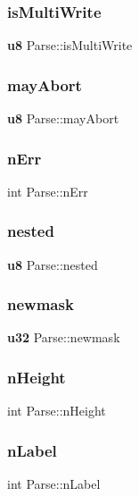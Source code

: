 \subsubsection{isMultiWrite}
{\footnotesize\ttfamily \textbf{ u8} Parse\+::is\+Multi\+Write}

\mbox{\label{struct_parse_a1813c80797fcdba29e95813284619e57}} 
\subsubsection{mayAbort}
{\footnotesize\ttfamily \textbf{ u8} Parse\+::may\+Abort}

\mbox{\label{struct_parse_ac7206f0c7e580ab32b7dfb20950bb1c9}} 
\subsubsection{nErr}
{\footnotesize\ttfamily int Parse\+::n\+Err}

\mbox{\label{struct_parse_a33d62687b6d368acf94e954490358819}} 
\subsubsection{nested}
{\footnotesize\ttfamily \textbf{ u8} Parse\+::nested}

\mbox{\label{struct_parse_a698d9e9d4938cc35a4ef9137a46f1840}} 
\subsubsection{newmask}
{\footnotesize\ttfamily \textbf{ u32} Parse\+::newmask}

\mbox{\label{struct_parse_af4ec053d44a2a3bc8ae82b69a7327c3c}} 
\subsubsection{nHeight}
{\footnotesize\ttfamily int Parse\+::n\+Height}

\mbox{\label{struct_parse_ab1a2fa5eb16fefcff4f61b19a1468f7d}} 
\subsubsection{nLabel}
{\footnotesize\ttfamily int Parse\+::n\+Label}

